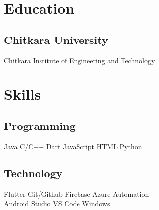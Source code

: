 \documentclass[]{deedy-resume-reversed}
\begin{document}
\hfill
\begin{minipage}[t]{0.35\textwidth}


\section{Education}

\subsection{Chitkara University}
Chitkara Institute of Engineering and Technology \\
\sectionsep


\section{Skills}
\subsection{Programming}
Java \textbullet{} C/C++ \textbullet{}
Dart \textbullet{} JavaScript \textbullet{}
HTML Python \\
\sectionsep

\subsection{Technology}
Flutter \textbullet{} Git/Github \textbullet{} Firebase \textbullet{}  Azure  Automation \\
Android Studio \textbullet{} VS Code \textbullet{} Windows 
\sectionsep




\end{minipage}
\end{document}
